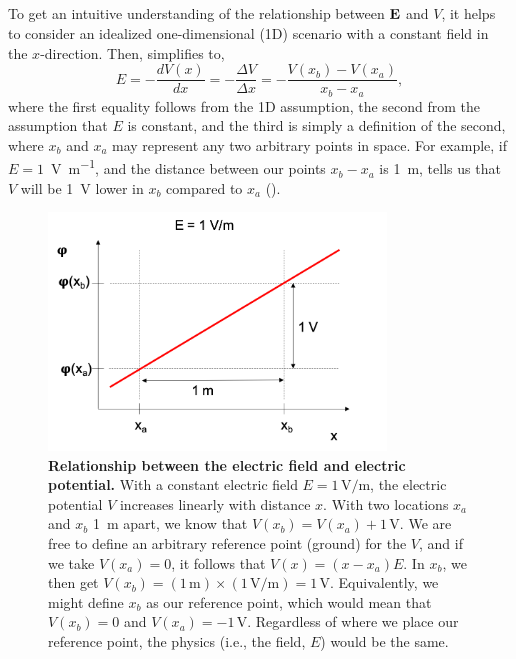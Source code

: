 \subsection{}
\label{sec:Basics:Ground}
To get an intuitive understanding of the relationship between ${\bf E}$ and $V$, it helps to consider an idealized one-dimensional (1D) scenario with a constant field in the $x$-direction. Then,  simplifies to,
\begin{equation}
E = -\frac{dV(x)}{dx} = -\frac{\Delta V}{\Delta x} = -\frac{V(x_b)-V(x_a)}{x_b-x_a},
\label{eq:Basics:EV1D}
\end{equation}
where the first equality follows from the 1D assumption, the second from the assumption that $E$ is constant, and the third is simply a definition of the second, where $x_b$ and $x_a$ may represent any two arbitrary points in space. For example, if $E = 1$~\si{\volt\per\metre}, and the distance between our points $x_b-x_a$ is 1~\si{\metre},  tells us that $V$ will be 1~\si{\volt} lower in $x_b$ compared to $x_a$ ().

\begin{figure}[!ht]
\begin{center}
\includegraphics[width=0.8\textwidth]{Figures/Basics/Ground.png}
\end{center}
\caption{\textbf{Relationship between the electric field and electric potential.} With a constant electric field $E = 1\,\si{\volt\per\metre}$, the electric potential $V$ increases linearly with distance $x$. With two locations $x_a$ and $x_b$ 1~\si{\metre} apart, we know that $V(x_b) = V(x_a) + 1\,\si{\volt}$. We are free to define an arbitrary reference point (ground) for the $V$, and if we take $V(x_a) = 0$, it follows that $V(x) = (x-x_a)E$. In $x_b$, we then get $V(x_b)=(1\,\si{\metre})\times(1\, \si{\volt\per\metre}) =1\,\si{\volt}$. Equivalently, we might define $x_b$ as our reference point, which would mean that $V(x_b) = 0$ and $V(x_a) = -1\,\si{\volt}$. Regardless of where we place our reference point, the physics (i.e., the field, $E$) would be the same.
}
\label{fig:Basics:Ground}
\end{figure}

